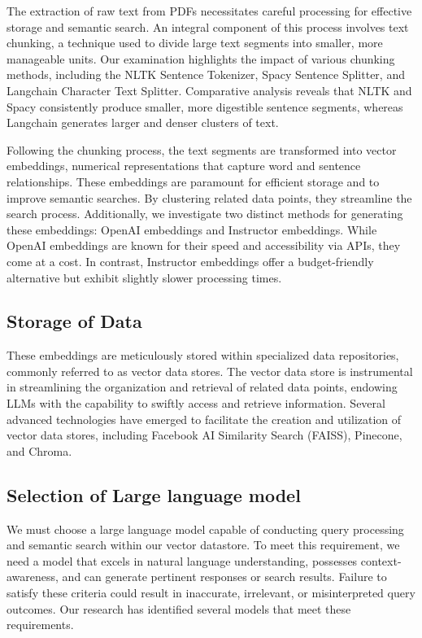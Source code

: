 \documentclass[conference]{IEEEtran}
\begin{document}
The extraction of raw text from PDFs necessitates careful processing for effective storage and semantic search. An integral component of this process involves text chunking, a technique used to divide large text segments into smaller, more manageable units. Our examination highlights the impact of various chunking methods, including the NLTK Sentence Tokenizer, Spacy Sentence Splitter, and Langchain Character Text Splitter. Comparative analysis reveals that NLTK and Spacy consistently produce smaller, more digestible sentence segments, whereas Langchain generates larger and denser clusters of text.

Following the chunking process, the text segments are transformed into vector embeddings, numerical representations that capture word and sentence relationships. These embeddings are paramount for efficient storage and to improve semantic searches. By clustering related data points, they streamline the search process. Additionally, we investigate two distinct methods for generating these embeddings: OpenAI embeddings and Instructor embeddings. While OpenAI embeddings are known for their speed and accessibility via APIs, they come at a cost. In contrast, Instructor embeddings offer a budget-friendly alternative but exhibit slightly slower processing times.

\subsection{Storage of Data}

These embeddings are meticulously stored within specialized data repositories, commonly referred to as vector data stores. The vector data store is instrumental in streamlining the organization and retrieval of related data points, endowing LLMs with the capability to swiftly access and retrieve information. Several advanced technologies have emerged to facilitate the creation and utilization of vector data stores, including Facebook AI Similarity Search (FAISS), Pinecone, and Chroma. 

\subsection{Selection of Large language model}
We must choose a large language model capable of conducting query processing and semantic search within our vector datastore. To meet this requirement, we need a model that excels in natural language understanding, possesses context-awareness, and can generate pertinent responses or search results. Failure to satisfy these criteria could result in inaccurate, irrelevant, or misinterpreted query outcomes. Our research has identified several models that meet these requirements.
\end{document}
